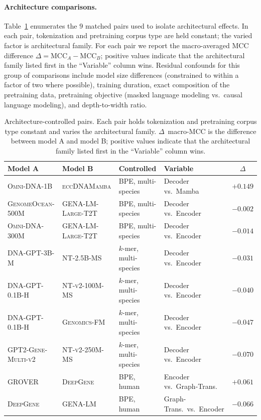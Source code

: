 \documentclass{article}
\theoremstyle{plain}
\theoremstyle{definition}
\theoremstyle{remark}
\begin{document}
\paragraph{Architecture comparisons.}
Table~\ref{tab:pairs_arch} enumerates the $9$ matched pairs used to
isolate architectural effects. In each pair, tokenization and
pretraining corpus type are held constant; the varied factor is
architectural family. For each pair we report the macro-averaged MCC
difference $\Delta = \text{MCC}_A - \text{MCC}_B$; positive values
indicate that the architectural family listed first in the ``Variable''
column wins. Residual confounds for this group of comparisons include
model size differences (constrained to within a factor of two where
possible), training duration, exact composition of the pretraining
data, pretraining objective (masked language modeling vs.\ causal
language modeling), and depth-to-width ratio.


\begin{table}[h]
\centering
\caption{Architecture-controlled pairs. Each pair holds tokenization
and pretraining corpus type constant and varies the architectural
family. $\Delta$~macro-MCC is the difference between model A and
model B; positive values indicate that the architectural family
listed first in the ``Variable'' column wins.}
\label{tab:pairs_arch}
\small
\begin{tabular}{@{}llllc@{}}
\toprule
\textbf{Model A} & \textbf{Model B} & \textbf{Controlled} & \textbf{Variable} & \textbf{$\Delta$} \\
\midrule
\textsc{Omni-DNA-1B}        & \textsc{eccDNAMamba}       & BPE, multi-species     & Decoder vs.\ Mamba         & $+0.149$ \\
\textsc{GenomeOcean-500M}   & \textsc{GENA-LM-Large-T2T} & BPE, multi-species     & Decoder vs.\ Encoder       & $-0.002$ \\
\textsc{Omni-DNA-300M}      & \textsc{GENA-LM-Large-T2T} & BPE, multi-species     & Decoder vs.\ Encoder       & $-0.014$ \\
\textsc{DNA-GPT-3B-M}       & \textsc{NT-2.5B-MS}        & $k$-mer, multi-species & Decoder vs.\ Encoder       & $-0.031$ \\
\textsc{DNA-GPT-0.1B-H}     & \textsc{NT-v2-100M-MS}     & $k$-mer, multi-species & Decoder vs.\ Encoder       & $-0.040$ \\
\textsc{DNA-GPT-0.1B-H}     & \textsc{Genomics-FM}       & $k$-mer, multi-species & Decoder vs.\ Encoder       & $-0.047$ \\
\textsc{GPT2-Gene-Multi-v2} & \textsc{NT-v2-250M-MS}     & $k$-mer, multi-species & Decoder vs.\ Encoder       & $-0.070$ \\
\textsc{GROVER}             & \textsc{DeepGene}          & BPE, human             & Encoder vs.\ Graph-Trans.  & $+0.061$ \\
\textsc{DeepGene}           & \textsc{GENA-LM}           & BPE, human             & Graph-Trans.\ vs.\ Encoder & $-0.066$ \\
\bottomrule
\end{tabular}
\end{table}
\end{document}
